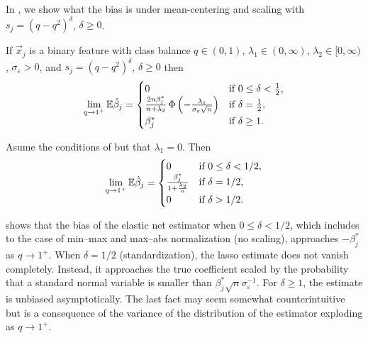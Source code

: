 In , we show what the
bias is under mean-centering and scaling with \(s_j = (q - q^2)^\delta\), \(\delta \geq 0\).

\begin{theorem}
  \label{thm:classbalance-bias}
  If \(\vec{x}_j\) is a binary feature with class balance \(q \in (0, 1)\), \(\lambda_1 \in (0,\infty)\), \(\lambda_2 \in [0,\infty)\), \(\sigma_\varepsilon > 0\), and \(s_j = (q - q^2)^{\delta}\), \(\delta \geq 0\)  then
  \[
    \lim_{q \rightarrow 1^+} \mathbb{E} \hat{\beta}_j =
    \begin{cases}
      0                                                                                                  & \text{if } 0 \leq \delta < \frac{1}{2}, \\
      \frac{2n \beta_j^*}{n + \lambda_2} \operatorname{\Phi}\left(-\frac{\lambda_1}{\sigma_\varepsilon \sqrt{n}}\right) & \text{if } \delta = \frac{1}{2},        \\
      \beta^*_j                                                                                          & \text{if } \delta \geq 1.
    \end{cases}
  \]
\end{theorem}

\begin{corollary}
  \label{cor:ridge-bias}
  Asume the conditions of  but that \(\lambda_1 = 0\). Then
  \[
    \lim_{q \rightarrow 1^+} \mathbb{E} \hat{\beta}_j =
    \begin{cases}
      0                                         & \text{if } 0 \leq \delta < 1/2, \\
      \frac{\beta_j^*}{1 + \frac{\lambda_2}{n}} & \text{if } \delta = 1/2,        \\
      0                                         & \text{if } \delta > 1/2.
    \end{cases}
  \]
\end{corollary}

 shows that the bias of the elastic net estimator when \(0 \leq \delta < 1/2\), which includes to the case of min--max and max--abs normalization (no scaling), approaches
\(-\beta_j^*\) as \(q \rightarrow 1^+\). When \(\delta = 1/2\) (standardization), the lasso estimate does not vanish completely. Instead, it approaches the
true coefficient scaled by the probability that a standard normal variable is smaller than \(\beta_j^*\sqrt{n}\sigma_\varepsilon^{-1}\). For \(\delta \geq 1\), the
estimate is unbiased asymptotically. The last fact may seem somewhat counterintuitive but is a consequence of the variance of the distribution of the estimator exploding as \(q \rightarrow 1^+\).

